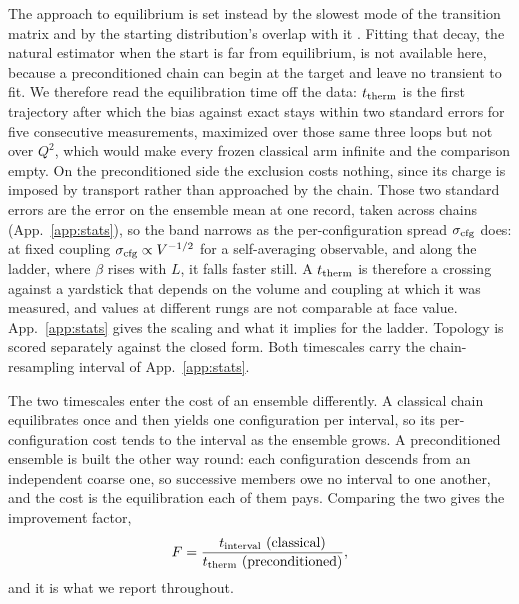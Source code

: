 \documentclass[prd, twocolumn, superscriptaddress, nofootinbib,floatfix]{revtex4-2}
\DeclareRobustCommand{\app}[1]{App.~\ref{app:#1}}
\begin{document}
The approach to equilibrium is set instead by the slowest mode of the transition
matrix and by the starting distribution's overlap with it
\cite{detmoldendres2015}. Fitting that decay, the natural estimator when the
start is far from equilibrium, is not available here, because a preconditioned
chain can begin at the target and leave no transient to fit. We therefore read the equilibration time off the data: $t_{\rm therm}$ is the
first trajectory after which the bias against exact stays within two standard
errors for five consecutive measurements, maximized over those same three loops
but not over $Q^2$, which would make every frozen classical arm infinite and the
comparison empty. On the preconditioned side the exclusion costs nothing, since
its charge is imposed by transport rather than approached by the chain. Those two standard errors are the error on the ensemble mean
at one record, taken across chains (\app{stats}), so the band narrows as the
per-configuration spread $\sigma_{\rm cfg}$ does: at fixed coupling
$\sigma_{\rm cfg}\propto V^{-1/2}$ for a self-averaging observable, and along
the ladder, where $\beta$ rises with $L$, it falls faster still. A
$t_{\rm therm}$ is therefore a crossing against a yardstick that depends on the
volume and coupling at which it was measured, and values at different rungs are
not comparable at face value. \app{stats} gives the scaling and what it implies
for the ladder.
Topology is scored separately against the closed form. Both timescales carry the
chain-resampling interval of \app{stats}.

The two timescales enter the cost of an ensemble differently. A classical chain
equilibrates once and then yields one configuration per interval, so its
per-configuration cost tends to the interval as the ensemble grows. A
preconditioned ensemble is built the other way round: each configuration
descends from an independent coarse one, so successive members owe no interval
to one another, and the cost is the equilibration each of them pays. Comparing
the two gives the improvement factor,
\begin{equation}
    F = \frac{t_{\rm interval}\ (\text{classical})}
             {t_{\rm therm}\ (\text{preconditioned})},
    \label{eq:improvement-factor}
\end{equation}
and it is what we report throughout.
\end{document}
